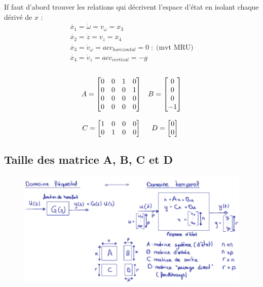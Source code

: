 \documentclass[document.tex]{subfiles}
\begin{document}
If faut d'abord trouver les relations qui décrivent l'espace d'état en isolant chaque dérivé de $x$ :
\begin{equation}
\begin{array}{c}
	\dot{x_1} = \dot{\omega} = v_{\omega} = x_3 \\[12pt]
	\dot{x_2} = \dot{z} = v_z = x_4 \\[12pt]
	\dot{x_3} = \dot{v}_{\omega} = acc_{horizontal} = 0 \; : \; \text{(mvt MRU)} \\[12pt]
	\dot{x_4} = \dot{v}_{z} = acc_{vertical} = -g
\end{array}
\end{equation}
\\[12pt]
\begin{equation}
\begin{array}{c c}
	A = \begin{bmatrix}
	0 & 0 & 1 & 0 \\ 0 & 0 & 0 & 1 \\ 0 & 0 & 0 & 0 \\ 0 & 0 & 0 & 0
	\end{bmatrix} & B = \begin{bmatrix}
	0 \\ 0 \\ 0 \\ -1
	\end{bmatrix} \\
	\; & \; \\
	C = \begin{bmatrix}
	1 & 0 & 0 & 0 \\
	0 & 1 & 0 & 0
	\end{bmatrix} & D = \begin{bmatrix}
	0 \\ 0
	\end{bmatrix}
\end{array}
\end{equation}




\subsection{Taille des matrice A, B, C et D}

\begin{figure}[H]
    \centering
    \includegraphics[width=\textwidth]{Include/Figure/13.png}
\end{figure}
\end{document}
